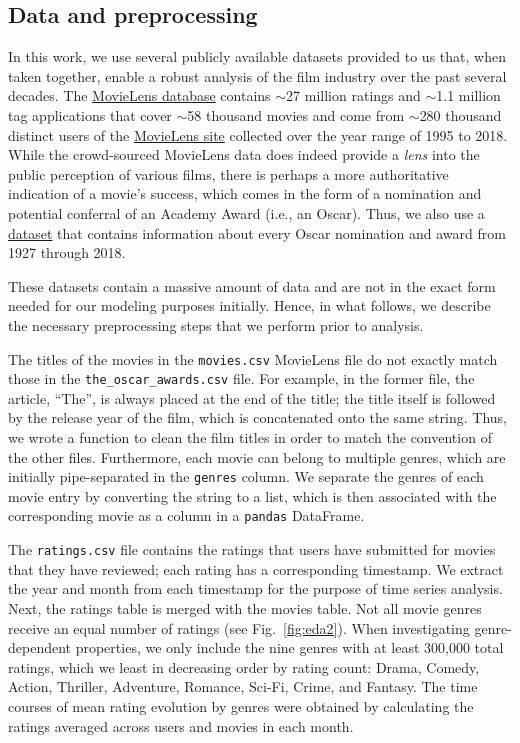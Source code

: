 \documentclass[dvipsnames]{article}
\begin{document}
\subsection{Data and preprocessing}

In this work, we use several publicly available datasets provided to us that, when taken together, enable a robust analysis of the film industry over the past several decades. The \href{https://grouplens.org/datasets/movielens/}{MovieLens database} \citep{MovieLens} contains ${\sim}$27 million ratings and ${\sim}$1.1 million tag applications that cover ${\sim}$58 thousand movies and come from ${\sim}$280 thousand distinct users of the \href{https://movielens.org/}{MovieLens site} collected over the year range of 1995 to 2018. While the crowd-sourced MovieLens data does indeed provide a \textit{lens} into the public perception of various films, there is perhaps a more authoritative indication of a movie's success, which comes in the form of a nomination and potential conferral of an Academy Award (i.e., an Oscar). Thus, we also use a \href{https://www.kaggle.com/unanimad/the-oscar-award}{dataset} that contains information about every Oscar nomination and award from 1927 through 2018. 

These datasets contain a massive amount of data and are not in the exact form needed for our modeling purposes initially. Hence, in what follows, we describe the necessary preprocessing steps that we perform prior to analysis.

The titles of the movies in the \texttt{movies.csv} MovieLens file do not exactly match those in the \texttt{the\_oscar\_awards.csv} file. For example, in the former file, the article, ``The'', is always placed at the end of the title; the title itself is followed by the release year of the film, which is concatenated onto the same string. Thus, we wrote a function to clean the film titles in order to match the convention of the other files. Furthermore, each movie can belong to multiple genres, which are initially pipe-separated in the \texttt{genres} column. We separate the genres of each movie entry by converting the string to a list, which is then associated with the corresponding movie as a column in a \texttt{pandas} DataFrame.

The \texttt{ratings.csv} file contains the ratings that users have submitted for movies that they have reviewed; each rating has a corresponding timestamp. We extract the year and month from each timestamp for the purpose of time series analysis. Next, the ratings table is merged with the movies table. Not all movie genres receive an equal number of ratings (see Fig.~\ref{fig:eda2}). When investigating genre-dependent properties, we only include the nine genres with at least 300,000 total ratings, which we least in decreasing order by rating count: Drama, Comedy, Action, Thriller, Adventure, Romance, Sci-Fi, Crime, and Fantasy. The time courses of mean rating evolution by genres were obtained by calculating the ratings averaged across users and movies in each month.
\end{document}
